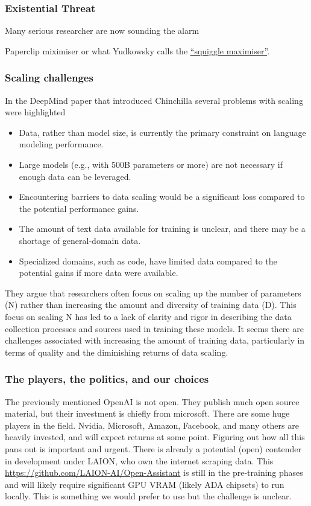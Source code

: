 \subsubsection{Existential Threat}
Many serious researcher are now sounding the alarm 

Paperclip miximiser \cite{bostrom2003ethical}
or what Yudkowsky calls the \href{https://www.lesswrong.com/tag/squiggle-maximizer-formerly-paperclip-maximizer}{``squiggle maximiser''}.
\subsubsection{Scaling challenges}
In the DeepMind paper that introduced Chinchilla \cite{hoffmann2022empirical} several problems with scaling were highlighted
\begin{itemize}
\item Data, rather than model size, is currently the primary constraint on language modeling performance.
\item Large models (e.g., with 500B parameters or more) are not necessary if enough data can be leveraged.
\item Encountering barriers to data scaling would be a significant loss compared to the potential performance gains.
\item The amount of text data available for training is unclear, and there may be a shortage of general-domain data.
\item Specialized domains, such as code, have limited data compared to the potential gains if more data were available.
\end{itemize}
They argue that researchers often focus on scaling up the number of parameters (N) rather than increasing the amount and diversity of training data (D). This focus on scaling N has led to a lack of clarity and rigor in describing the data collection processes and sources used in training these models. It seems  there are challenges associated with increasing the amount of training data, particularly in terms of quality and the diminishing returns of data scaling. 
\subsubsection{The players, the politics, and our choices}
The previously mentioned OpenAI is not open. They publish much open source material, but their investment is chiefly from microsoft. There are some huge players in the field. Nvidia, Microsoft, Amazon, Facebook, and many others are heavily invested, and will expect returns at some point. Figuring out how all this pans out is important and urgent. There is already a potential (open) contender in development under LAION, who own the internet scraping data. This \href{'Open-Assistant'}{https://github.com/LAION-AI/Open-Assistant} is still in the pre-training phases and will likely require significant GPU VRAM (likely ADA chipsets) to run locally. This is something we would prefer to use but the challenge is unclear.
